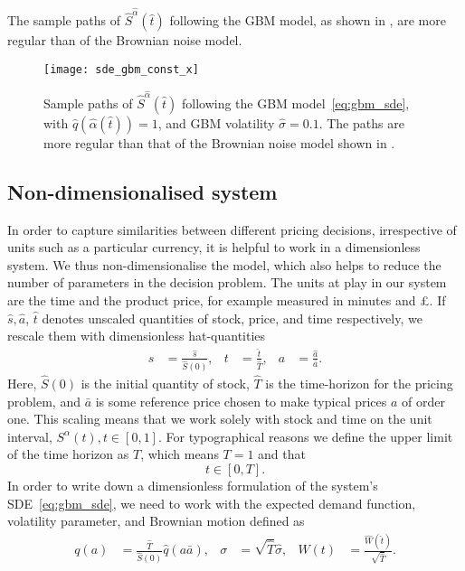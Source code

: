 \documentclass[main.tex]{subfiles}
\begin{document}
The sample paths of $\hat{S}^{\hat{\alpha}}(\hat{t})$ following the GBM model, as shown in
, are more regular
than of the Brownian noise model.
\begin{figure}[htbp]
  \centering
  \texttt{[image: sde\_gbm\_const\_x]}
  \caption{Sample paths of $\hat{S}^{\hat{\alpha}}(\hat{t})$ following the GBM
    model~\eqref{eq:gbm_sde}, with $\hat{q}(\hat{\alpha}(\hat{t}))=1$, and GBM volatility
    $\hat{\sigma} = 0.1$. The paths are  more regular than that of the
    Brownian noise model shown in .
  }\label{fig:sde_gbm_const_x}
\end{figure}

\subsection{Non-dimensionalised system}\label{subsec:nondimensionalisation}
In order to capture similarities between different pricing decisions, irrespective of units
such as a particular currency, it is helpful to work in a dimensionless system.
We thus non-dimensionalise the model, which also helps to reduce the
number of parameters in the decision problem.
The units at play in our system are the time and the product price,
for example measured in minutes and \pounds.
If $\hat{s},\hat{a}$, $\hat{t}$ denotes unscaled quantities of stock, price, and
time respectively, we rescale them with dimensionless hat-quantities
\begin{align}
  s&=\frac{\hat{s}}{\hat{S}(0)},&t &=\frac{\hat{t}}{\hat{T}},
  &a &= \frac{\hat{a}}{\bar{a}}.
\end{align}
Here, $\hat{S}(0)$ is the initial quantity of stock, $\hat{T}$ is the time-horizon
for the pricing problem, and $\bar{a}$ is some reference price chosen
to make typical prices $a$ of order one.
This scaling means that we work solely with stock and time on the unit
interval, $S^{\alpha}(t),t\in[0,1]$.
For typographical reasons we define the upper limit of the time
horizon as $T$, which means $T=1$ and that
\begin{equation}
  t\in[0,T].
\end{equation}
In order to write down a dimensionless formulation of the system's
SDE~\eqref{eq:gbm_sde}, we need to work with the expected demand
function, volatility parameter, and Brownian motion defined as
\begin{align}
  q(a)&=\frac{\hat{T}}{\hat{S}(0)}\hat{q}(a \bar{a}),
  &\sigma &= \sqrt{\hat{T}}\hat{\sigma},
  &W(t) &= \frac{\hat{W}(\hat{t})}{ \sqrt{\hat{T}}}.
\end{align}
\end{document}

